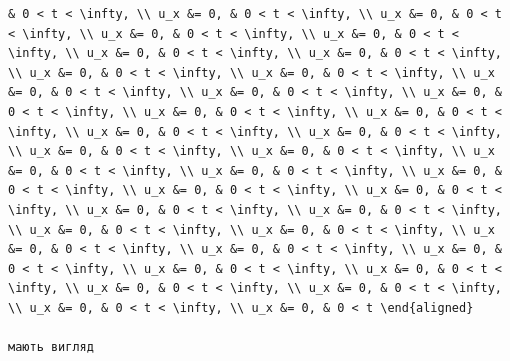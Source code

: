 \documentclass[
  ukrainian,
]{article}
\begin{document}
\begin{verbatim}
& 0 < t < \infty, \\ u_x &= 0, & 0 < t < \infty, \\ u_x &= 0, & 0 < t < \infty, \\ u_x &= 0, & 0 < t < \infty, \\ u_x &= 0, & 0 < t < \infty, \\ u_x &= 0, & 0 < t < \infty, \\ u_x &= 0, & 0 < t < \infty, \\ u_x &= 0, & 0 < t < \infty, \\ u_x &= 0, & 0 < t < \infty, \\ u_x &= 0, & 0 < t < \infty, \\ u_x &= 0, & 0 < t < \infty, \\ u_x &= 0, & 0 < t < \infty, \\ u_x &= 0, & 0 < t < \infty, \\ u_x &= 0, & 0 < t < \infty, \\ u_x &= 0, & 0 < t < \infty, \\ u_x &= 0, & 0 < t < \infty, \\ u_x &= 0, & 0 < t < \infty, \\ u_x &= 0, & 0 < t < \infty, \\ u_x &= 0, & 0 < t < \infty, \\ u_x &= 0, & 0 < t < \infty, \\ u_x &= 0, & 0 < t < \infty, \\ u_x &= 0, & 0 < t < \infty, \\ u_x &= 0, & 0 < t < \infty, \\ u_x &= 0, & 0 < t < \infty, \\ u_x &= 0, & 0 < t < \infty, \\ u_x &= 0, & 0 < t < \infty, \\ u_x &= 0, & 0 < t < \infty, \\ u_x &= 0, & 0 < t < \infty, \\ u_x &= 0, & 0 < t < \infty, \\ u_x &= 0, & 0 < t < \infty, \\ u_x &= 0, & 0 < t < \infty, \\ u_x &= 0, & 0 < t < \infty, \\ u_x &= 0, & 0 < t < \infty, \\ u_x &= 0, & 0 < t < \infty, \\ u_x &= 0, & 0 < t < \infty, \\ u_x &= 0, & 0 < t \end{aligned}

мають вигляд


\end{verbatim}
\end{document}
